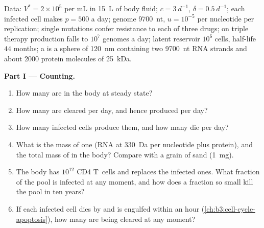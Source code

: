 \begin{problem}
\label{pb:b3:virology:1}
Data:  $V^{*} = 2\times 10^{5}$ per mL in \qty{15}{L} of body
fluid; $c = \qty{3}{d^{-1}}$, $\delta = \qty{0.5}{d^{-1}}$; each infected
cell makes $p = 500$  a day; genome \qty{9700}{nt}, $u = 10^{-5}$
per nucleotide per replication; single mutations confer resistance to
each of three drugs; on triple therapy production falls to $10^{7}$
genomes a day; latent reservoir $10^{6}$ cells, half-life $44$ months;
a  is a sphere of \qty{120}{nm} containing two \qty{9700}{nt} RNA
strands and about \num{2000} protein molecules of \qty{25}{kDa}.

\medskip
\noindent\textbf{Part I --- Counting.}
\begin{enumerate}
  \item How many  are in the body at steady state?
  \item How many are cleared per day, and hence produced per day?
  \item How many infected cells produce them, and how many die per
        day?
  \item What is the mass of one  (RNA at \qty{330}{Da} per
        nucleotide plus protein), and the total mass of  in the
        body? Compare with a grain of sand (\qty{1}{mg}).
  \item The body has $10^{12}$ CD4 T~cells and replaces the infected
        ones. What fraction of the pool is infected at any moment, and
        how does a fraction so small kill the pool in ten years?
  \item If each infected cell dies by  and is engulfed within
        an hour (\cref{ch:b3:cell-cycle-apoptosis}), how many are being
        cleared at any moment?
\end{enumerate}


\end{problem}
